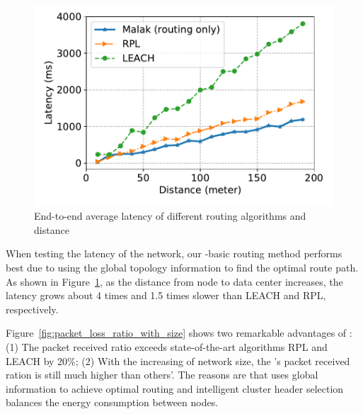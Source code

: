 \begin{figure}[htbp]
	\centering
	\includegraphics[width=.95\columnwidth]{Figure/latency}
	\vspace{-0.1in}
	\caption{End-to-end average latency of different routing algorithms and distance
		\textnormal{
		}}
	\label{fig:latency}
\end{figure}

When testing the latency of the network, our {\sdn}-basic routing method
performs best due to using the global topology information to find the optimal
route path. As shown in Figure~\ref{fig:latency}, as the distance from node to
data center increases, the latency grows about 4 times and 1.5 times slower than
LEACH and RPL, respectively.

Figure~\ref{fig:packet_loss_ratio_with_size} shows two remarkable advantages of
{\sdn}: (1) The packet received ratio exceeds state-of-the-art algorithms
RPL\cite{winter2012rpl} and LEACH\cite{kaur2016wsn} by 20\%; (2) With the
increasing of network size, the {\sdn}'s packet received ration is still much
higher than others'. The reasons are that {\sdn} uses global information to
achieve optimal routing and intelligent cluster header selection balances the
energy consumption between nodes.

